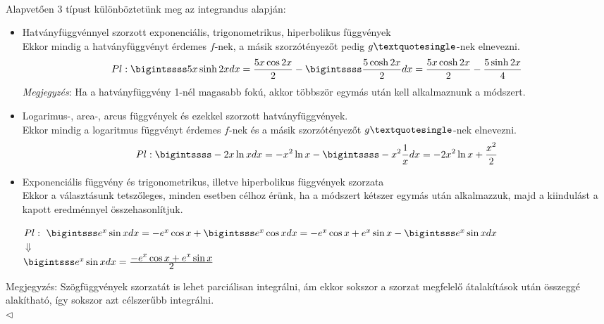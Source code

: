 \documentclass[12pt,margin=0px]{article}
\newcommand\ddfrac[2]{\frac{\displaystyle #1}{\displaystyle #2}}
\begin{document}
    {\footnotesize \noindent {\color{blue} \faLightbulbO\ $\triangleright$ } }
    {\footnotesize\\
    \noindent Alapvetően 3 típust különböztetünk meg az integrandus alapján:
    \begin{itemize}
      \item Hatványfüggvénnyel szorzott exponenciális, trigonometrikus, hiperbolikus függvények\\

      Ekkor mindig a hatványfüggvényt érdemes $f$-nek, a másik szorzótényezőt pedig $g \textquotesingle$-nek elnevezni.
      \[
        Pl: \bigintssss 5x \sinh 2x dx = \ddfrac{5x \cos 2x}{2} - \bigintssss \ddfrac{5 \cosh 2x}{2}dx = \ddfrac{5x \cosh 2x}{2} - \ddfrac{5 \sinh 2x}{4}
      \]
      \emph{Megjegyzés}: Ha a hatványfüggvény 1-nél magasabb fokú, akkor többször egymás után kell alkalmaznunk a módszert.
      \item Logarimus-, area-, arcus függvények és ezekkel szorzott hatványfüggvények.\\

      Ekkor mindig a logaritmus függvényt érdemes $f$-nek és a másik szorzótényezőt $g \textquotesingle$-nek elnevezni.
      \[
         Pl: \bigintssss -2x \ln x dx = -x^2 \ln x - \bigintssss -x^2\ddfrac{1}{x} dx = -2 x^2 \ln x + \ddfrac{x^2}{2}
      \]
      \item Exponenciális függvény és trigonometrikus, illetve hiperbolikus függvények szorzata\\

      Ekkor a választásunk tetszőleges, minden esetben célhoz érünk, ha a módszert kétszer egymás után alkalmazzuk, majd a kiindulást a kapott eredménnyel összehasonlítjuk.
      \begin{center}
         $Pl:\ \bigintsss e^x \sin x dx = -e^x \cos x + \bigintsss e^x \cos x dx = -e^x \cos x + e^x \sin x - \bigintsss e^x \sin x dx$\\
        $\Downarrow$ \\
        $\bigintsss e^x \sin x dx = \ddfrac{-e^x \cos x + e^x \sin x}{2}$
      \end{center}
    \end{itemize}

    \noindent Megjegyzés: Szögfüggvények szorzatát is lehet parciálisan integrálni, ám ekkor sokszor a szorzat megfelelő átalakítások után összeggé alakítható, így sokszor azt célszerűbb integrálni. \\
    $\triangleleft$ \faLightbulbO}\\
\end{document}
